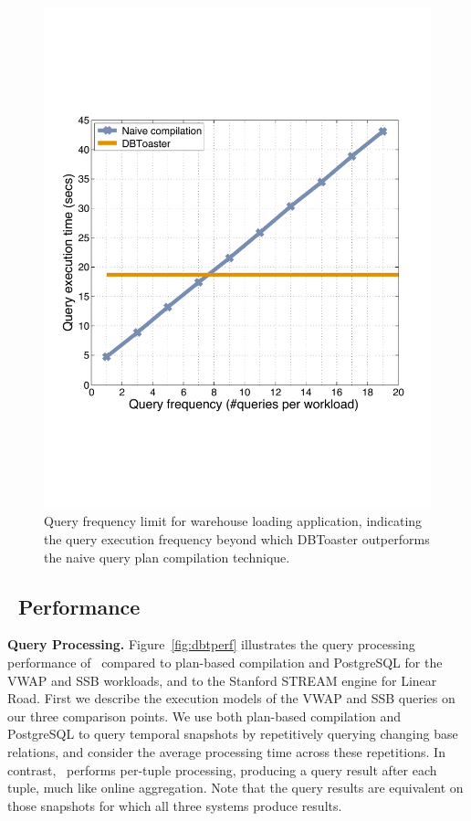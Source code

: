 \begin{figure}[tb]
\begin{center}
\includegraphics[scale=0.25]{../plots/ssb_query_freq_dn}
\end{center}
\vspace{-4mm}
\caption{Query frequency limit for warehouse loading application, indicating the
query execution frequency beyond which DBToaster outperforms the naive query
plan compilation technique.}
\label{fig:ssb_query_freq}
\end{figure}



\subsection{\compiler\ Performance}

\textbf{Query Processing.}
Figure~\ref{fig:dbtperf} illustrates the query processing performance of
\compiler\ compared to plan-based compilation and PostgreSQL for the VWAP and SSB
workloads, and to the Stanford STREAM engine for Linear Road. First we describe
the execution models of the VWAP and SSB queries on our three comparison points.
We use both plan-based compilation and PostgreSQL to query temporal snapshots by
repetitively querying changing base relations, and consider the average
processing time across these repetitions. In contrast, \compiler\ performs
per-tuple processing, producing a query result after each tuple, much like online
aggregation. Note that the query results are equivalent on those snapshots for
which all three systems produce results.

